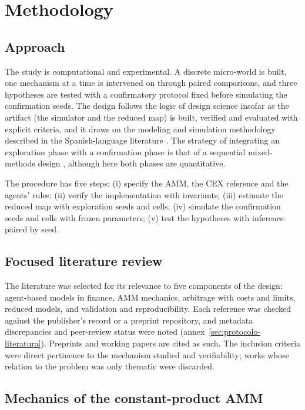 \chapter{Methodology}
\label{cap:metodologia}

\section{Approach}

The study is computational and experimental. A discrete micro-world is built, one mechanism at a time is intervened on through paired comparisons, and three hypotheses are tested with a confirmatory protocol fixed before simulating the confirmation seeds. The design follows the logic of design science \cite{hevner2004design} insofar as the artifact (the simulator and the reduced map) is built, verified and evaluated with explicit criteria, and it draws on the modeling and simulation methodology described in the Spanish-language literature \cite{hernandez2014metodologia}. The strategy of integrating an exploration phase with a confirmation phase is that of a sequential mixed-methods design \cite{creswell2018research}, although here both phases are quantitative.

The procedure has five steps: (i) specify the AMM, the CEX reference and the agents' rules; (ii) verify the implementation with invariants; (iii) estimate the reduced map with exploration seeds and cells; (iv) simulate the confirmation seeds and cells with frozen parameters; (v) test the hypotheses with inference paired by seed.

\section{Focused literature review}

The literature was selected for its relevance to five components of the design: agent-based models in finance, AMM mechanics, arbitrage with costs and limits, reduced models, and validation and reproducibility. Each reference was checked against the publisher's record or a preprint repository, and metadata discrepancies and peer-review status were noted (annex~\ref{sec:protocolo-literatura}). Preprints and working papers are cited as such. The inclusion criteria were direct pertinence to the mechanism studied and verifiability; works whose relation to the problem was only thematic were discarded.

\section{Mechanics of the constant-product AMM}
\label{sec:amm}

